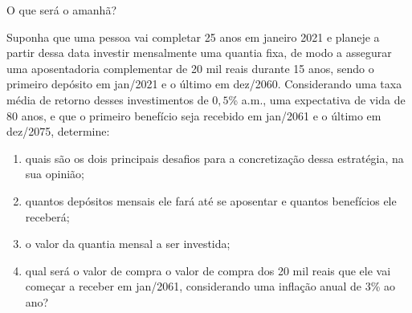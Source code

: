 \label{fin-prac-5}

\begin{task}{O que será o amanhã?}
\label{fin-ativ-23}

Suponha que uma pessoa vai completar 25 anos em janeiro 2021 e planeje a partir dessa data investir mensalmente uma quantia fixa, de modo a assegurar uma aposentadoria complementar de 20 mil reais durante 15 anos, sendo o primeiro depósito em jan/2021 e o último em dez/2060. Considerando uma taxa média de retorno desses investimentos de $0{,}5$\% a.m., uma expectativa de vida de 80 anos, e que o primeiro benefício seja recebido em jan/2061 e o último em dez/2075, determine:
\begin{enumerate}
  \item quais são os dois principais desafios para a concretização dessa estratégia, na sua opinião;
  \item quantos depósitos mensais ele fará até se aposentar e quantos benefícios ele receberá;
  \item o valor da quantia mensal a ser investida;
  \item qual será o valor de compra o valor de compra dos 20 mil reais que ele vai começar a receber em jan/2061, considerando uma inflação anual de $3$\% ao ano?
\end{enumerate}
\end{task}

